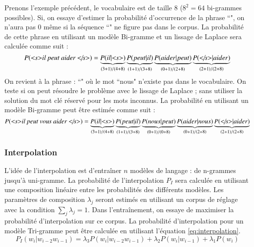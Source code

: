 \documentclass{KodeBook}
\begin{document}
Prenons l'exemple précédent, le vocabulaire est de taille $8$ ($8^2 = 64$ bi-grammes possibles).
Si, on essaye d'estimer la probabilité d'occurrence de la phrase ``", on n'aura pas $0$ même si la séquence ``" ne figure pas dans le corpus.
La probabilité de cette phrase en utilisant un modèle Bi-gramme et un lissage de Laplace sera calculée comme suit : 
\[
P(\text{\textit{\textless s\textgreater il peut aider \textless/s\textgreater}}) = 
\underbrace{P(il|\text{\textit{\textless s\textgreater}})}_{(3+1)/(4+8)}
\underbrace{P(peut|il)}_{(1+1)/(3+8)} 
\underbrace{P(aider|peut)}_{(0+1)/(2+8)}
\underbrace{P(\text{\textit{\textless/s\textgreater}}|aider)}_{(2+1)/(2+8)}
\]
%
On revient à la phrase : 
``" où le mot ``nous" n'existe pas dans le vocabulaire. 
On teste si on peut résoudre le problème avec le lissage de Laplace ; sans utiliser la solution du mot clé réservé pour les mots inconnus.
La probabilité en utilisant un modèle Bi-gramme peut être estimée comme suit : 
\[
P(\text{\textit{\textless s\textgreater il peut vous aider \textless/s\textgreater}}) = 
\underbrace{P(il|\text{\textit{\textless s\textgreater}})}_{(3+1)/(4+8)}
\underbrace{P(peut|il)}_{(1+1)/(3+8)} 
\underbrace{P(nous|peut)}_{(0+1)/(0+8)} 
\underbrace{P(aider|nous)}_{(0+1)/(2+8)}
\underbrace{P(\text{\textit{\textless/s\textgreater}}|aider)}_{(2+1)/(2+8)}
\]

\subsubsection{Interpolation}

L'idée de l'interpolation est d'entraîner $n$ modèles de langage : de n-grammes jusqu'à uni-gramme. 
La probabilité de l'interpolation $P_I$ sera calculée en utilisant une composition linéaire entre les probabilités des différents modèles. 
Les paramètres de composition $\lambda_j$ seront estimés en utilisant un corpus de réglage avec la condition $\sum_j \lambda_j = 1$.
Dans l'entraînement, on essaye de maximiser la probabilité d'interpolation sur ce corpus.
La probabilité d'interpolation pour un modèle Tri-gramme peut être calculée en utilisant l'équation \ref{eq:interpolation}. 
\begin{equation}
	P_{I}(w_i | w_{i-2} w_{i-1}) = 
	\lambda_3 P(w_i | w_{i-2} w_{i-1}) 
	+ \lambda_2 P(w_i | w_{i-1}) 
	+ \lambda_1 P(w_i) 
	\label{eq:interpolation}
\end{equation}
\end{document}
